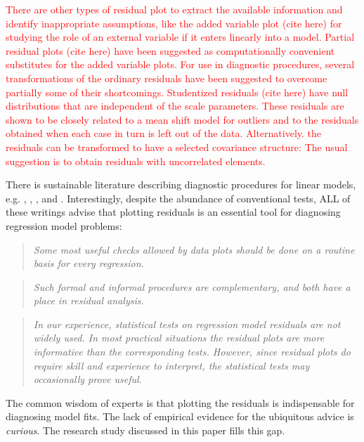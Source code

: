 \documentclass[]{interact}
\theoremstyle{plain}%
\theoremstyle{definition}
\theoremstyle{remark}
\begin{document}
\textcolor{red}{There are other types of residual plot to extract the available information and identify inappropriate assumptions, like the added variable plot (cite here) for studying the role of an external variable if it enters linearly into a model. Partial residual plots (cite here) have been suggested as computationally convenient substitutes for the added variable plots. For use in diagnostic procedures, several transformations of the ordinary residuals have been suggested to overcome partially some of their shortcomings. Studentized residuals (cite here) have null distributions that are independent of the scale parameters. These residuals are shown to be closely related to a mean shift model for outliers and to the residuals obtained when each case in turn is left out of the data. Alternatively. the residuals can be transformed to have a selected covariance structure: The usual suggestion is to obtain residuals with uncorrelated elements.}

There is sustainable literature describing diagnostic procedures for
linear models, e.g. \citet{draper1998applied},
\citet{montgomery1982introduction}, \citet{belsley1980regression},
\citet{cook1999applied} and \citet{cook1982residuals}. Interestingly,
despite the abundance of conventional tests, ALL of these writings
advise that plotting residuals is an essential tool for diagnosing
regression model problems:

\begin{quote}
\emph{Some most useful checks allowed by data plots should be done on a
routine basis for every regression.} \citep{draper1998applied}
\end{quote}

\begin{quote}
\emph{Such formal and informal procedures are complementary, and both
have a place in residual analysis.} \citep{cook1982residuals}
\end{quote}

\begin{quote}
\emph{In our experience, statistical tests on regression model residuals
are not widely used. In most practical situations the residual plots are
more informative than the corresponding tests. However, since residual
plots do require skill and experience to interpret, the statistical
tests may occasionally prove useful.} \citep{montgomery1982introduction}
\end{quote}

\noindent The common wisdom of experts is that plotting the residuals is
indispensable for diagnosing model fits. The lack of empirical evidence
for the ubiquitous advice is \emph{curious}. The research study
discussed in this paper fills this gap.
\end{document}
